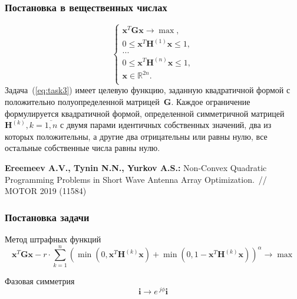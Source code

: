 \begin{frame}
    \frametitle{Постановка в вещественных числах}
    \begin{equation}
        \begin{cases}
           \textbf{x}^{T}\textbf{Gx} \rightarrow \max,\\
           0 \leq \textbf{x}^{T}\textbf{H}^{(1)}\textbf{x} \leq 1,\\
           ...\\
           0 \leq \textbf{x}^{T}\textbf{H}^{(n)}\textbf{x} \leq 1,\\
          \textbf{x} \in \mathbb{R}^{2n}.\\
         \end{cases}
         \label{eq:task3}
    \end{equation}
Задача~(\ref{eq:task3}) имеет целевую функцию, заданную квадратичной формой с положительно полуопределенной матрицей~$\textbf{G}$. Каждое ограничение формулируется квадратичной формой, определенной симметричной матрицей~$\textbf{H}^{(k)}, k=\overline{1,n}$ с двумя парами идентичных собственных значений, два из которых положительны, а другие два отрицательны или равны нулю, все остальные собственные числа равны нулю.

\vspace{2em}


\footnotesize { \textbf{Ereemeev A.V., Tynin N.N., Yurkov A.S.:} Non-Convex Quadratic Programming Problems in Short Wave Antenna Array Optimization.~// MOTOR 2019 (11584) }
\end{frame}


\begin{frame}
    \frametitle{Постановка задачи}
    \begin{block}{Метод штрафных функций}
        \begin{equation}
               \textbf{x}^{T}\textbf{Gx} - r\cdot \sum_{k=1}^n
               \left( \min\left(0,\textbf{x}^{T}\textbf{H}^{(k)}\textbf{x}\right) +
               \min\left(0,1-\textbf{x}^{T}\textbf{H}^{(k)}\textbf{x}\right)\right)^{\alpha} \rightarrow
               \max
             \label{eq:task4}
        \end{equation}
    \end{block}

    \begin{block}{Фазовая симметрия}
        \begin{equation}
            \textbf{i} \to e^{~{j}\phi}\textbf{i}
             \label{eq:phase_sym}
        \end{equation}
    \end{block}
\end{frame}

